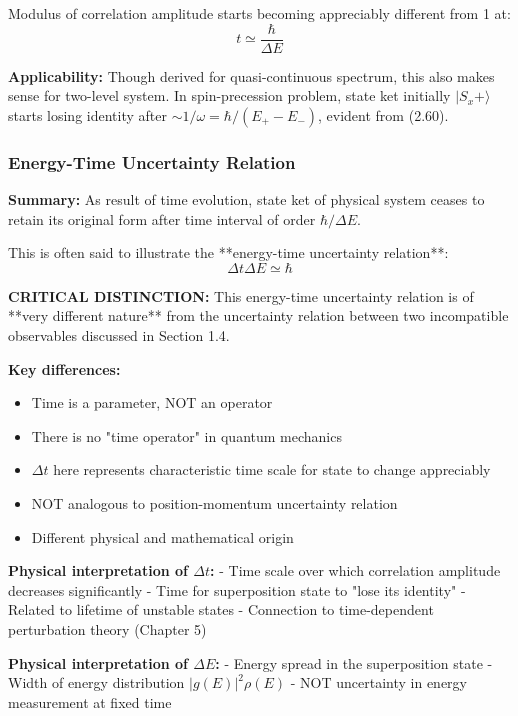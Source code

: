 \documentclass[11pt,a4paper]{article}
\begin{document}
Modulus of correlation amplitude starts becoming appreciably different from 1 at:
\begin{equation}
\boxed{t \simeq \frac{\hbar}{\Delta E}}
\tag{2.73}
\end{equation}

\textbf{Applicability:} Though derived for quasi-continuous spectrum, this also makes sense for two-level system. In spin-precession problem, state ket initially $|S_x+\rangle$ starts losing identity after $\sim 1/\omega = \hbar/(E_+ - E_-)$, evident from (2.60).

\subsubsection{Energy-Time Uncertainty Relation}

\textbf{Summary:} As result of time evolution, state ket of physical system ceases to retain its original form after time interval of order $\hbar/\Delta E$.

This is often said to illustrate the **energy-time uncertainty relation**:
\begin{equation}
\boxed{\Delta t \Delta E \simeq \hbar}
\tag{2.74}
\end{equation}

\textbf{CRITICAL DISTINCTION:} This energy-time uncertainty relation is of **very different nature** from the uncertainty relation between two incompatible observables discussed in Section 1.4.

\textbf{Key differences:}
\begin{itemize}
\item Time is a parameter, NOT an operator
\item There is no "time operator" in quantum mechanics
\item $\Delta t$ here represents characteristic time scale for state to change appreciably
\item NOT analogous to position-momentum uncertainty relation
\item Different physical and mathematical origin
\end{itemize}

\textbf{Physical interpretation of $\Delta t$:}
- Time scale over which correlation amplitude decreases significantly
- Time for superposition state to "lose its identity"
- Related to lifetime of unstable states
- Connection to time-dependent perturbation theory (Chapter 5)

\textbf{Physical interpretation of $\Delta E$:}
- Energy spread in the superposition state
- Width of energy distribution $|g(E)|^2\rho(E)$
- NOT uncertainty in energy measurement at fixed time
\end{document}
